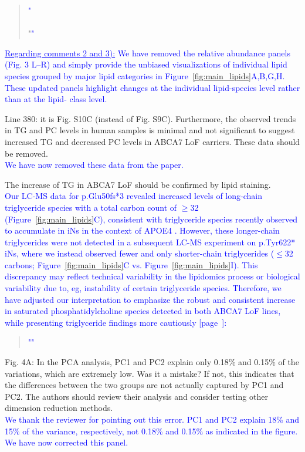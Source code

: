 \documentclass[12pt]{article}
\begin{document}
\begin{quote}
	\textcolor{blue}{"}\quoteA\\\\
	\quoteB"\textcolor{blue}{"}
\end{quote}  
\textcolor{blue}{\underline{Regarding comments 2 and 3):} We have removed the relative abundance panels (Fig. 3 L–R) and simply provide the unbiased visualizations of individual lipid species grouped by major lipid categories in Figure~\ref{fig:main_lipids}A,B,G,H. These updated panels highlight changes at the individual lipid-species level rather than at the lipid- class level.}

Line 380: it is Fig. S10C (instead of Fig. S9C). Furthermore, the observed trends in TG and PC levels in human samples is minimal and not significant to suggest increased TG and decreased PC levels in ABCA7 LoF carriers. These data should be removed.\\
 \textcolor{blue}{We have now removed these data from the paper.}

The increase of TG in ABCA7 LoF should be confirmed by lipid staining.\\
\textcolor{blue}{Our LC-MS data for p.Glu50fs*3 revealed increased levels of long-chain triglyceride species with a total carbon count of $\geq$32 (Figure~\ref{fig:main_lipids}C), consistent with triglyceride species recently observed to accumulate in iNs in the context of APOE4 \cite{Haney2024-bp}. However, these longer-chain triglycerides were not detected in a subsequent LC-MS experiment on p.Tyr622* iNs, where we instead observed fewer and only shorter-chain triglycerides ($\leq$32 carbons; Figure~\ref{fig:main_lipids}C vs. Figure~\ref{fig:main_lipids}I). This discrepancy may reflect technical variability in the lipidomics process or biological variability due to, eg, instability of certain triglyceride species. Therefore, we have adjusted our interpretation to emphasize the robust and consistent increase in saturated phosphatidylcholine species detected in both ABCA7 LoF lines, while presenting triglyceride findings more cautiously [page~\pageref{quoteH-label}]:}
\begin{quote}
	\textcolor{blue}{"\quoteH"}
\end{quote}

Fig. 4A: In the PCA analysis, PC1 and PC2 explain only 0.18\% and 0.15\% of the variations, which are extremely low. Was it a mistake? If not, this indicates that the differences between the two groups are not actually captured by PC1 and PC2. The authors should review their analysis and consider testing other dimension reduction methods.\\
\textcolor{blue}{We thank the reviewer for pointing out this error. PC1 and PC2 explain 18\% and 15\% of the variance, respectively, not 0.18\% and 0.15\% as indicated in the figure. We have now corrected this panel.}
\end{document}
